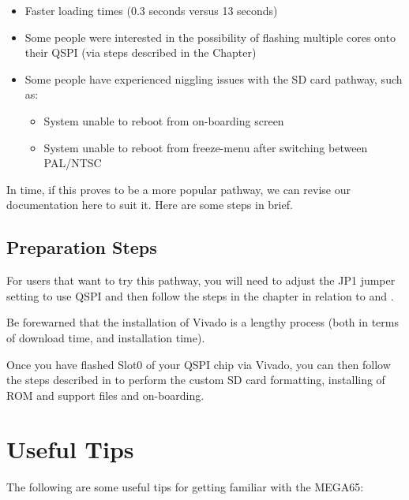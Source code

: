\begin{itemize}
  \item Faster loading times (0.3 seconds versus 13 seconds)
  \item Some people were interested in the possibility of flashing multiple cores onto their QSPI (via steps described in the  Chapter)
  \item Some people have experienced niggling issues with the SD card pathway, such as:
    \begin{itemize}
      \item System unable to reboot from on-boarding screen
      \item System unable to reboot from freeze-menu after switching between PAL/NTSC
    \end{itemize}
\end{itemize}

In time, if this proves to be a more popular pathway, we can revise our documentation here to suit it. Here are some steps in brief.

\subsection{Preparation Steps}

For users that want to try this pathway, you will need to adjust the JP1 jumper setting to use QSPI and then follow the steps in the  chapter in relation to  and .

Be forewarned that the installation of Vivado is a lengthy process (both in terms of download time, and installation time).

Once you have flashed Slot0 of your QSPI chip via Vivado, you can then follow the steps described in  to perform the custom SD card formatting, installing of ROM and support files and on-boarding.

\section{Useful Tips}

The following are some useful tips for getting familiar with the MEGA65:

